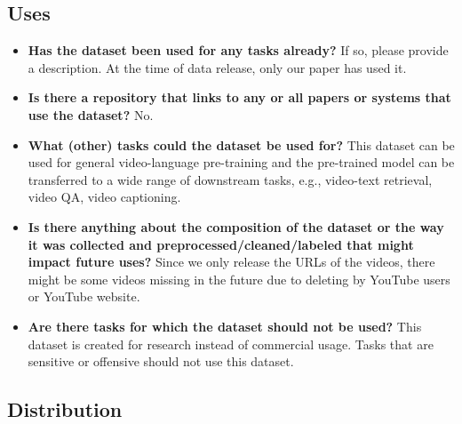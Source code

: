 \subsection{Uses}

\begin{itemize}

\item \textbf{Has the dataset been used for any tasks already?} If so, please provide a description.
At the time of data release, only our paper has used it.

\item \textbf{Is there a repository that links to any or all papers or systems that use the dataset?}
No.

\item \textbf{What (other) tasks could the dataset be used for?}
This dataset can be used for general video-language pre-training and the pre-trained model can be transferred to a wide range of downstream tasks, e.g., video-text retrieval, video QA, video captioning.

\item \textbf{Is there anything about the composition of the dataset or the way it was collected and preprocessed/cleaned/labeled that might impact future uses?} 
Since we only release the URLs of the videos, there might be some videos missing in the future due to deleting by YouTube users or YouTube website.

\item \textbf{Are there tasks for which the dataset should not be used?}
This dataset is created for research instead of commercial usage. Tasks that are sensitive or offensive should not use this dataset.

\end{itemize}

\subsection{Distribution}

